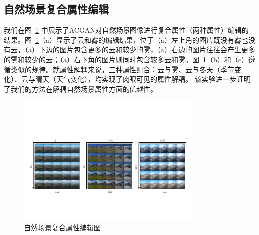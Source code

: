 \subsection{自然场景复合属性编辑}
我们在图~\ref{fig:sceneMulti} 中展示了ACGAN对自然场景图像进行复合属性（两种属性）编辑的结果。图~\ref{fig:sceneMulti}（a）显示了云和雾的编辑结果，位于（a）左上角的图片既没有雾也没有云，（a）下边的图片包含更多的云和较少的雾，（a）右边的图片往往会产生更多的雾和较少的云；（a）右下角的图片则同时包含较多云和雾。图~\ref{fig:sceneMulti}（b）和（c）遵循类似的规律。就属性解耦来说，三种属性组合：云与雾、云与冬天（季节变化）、云与晴天（天气变化），均实现了肉眼可见的属性解耦。 该实验进一步证明了我们的方法在解耦自然场景属性方面的优越性。

\begin{figure}[!ht]
	\begin{center}
		 \includegraphics[width=0.8\textwidth]{figures/ACGAN/sceneMulti.pdf}
	\end{center}
	\caption{自然场景复合属性编辑图}
	\label{fig:sceneMulti}
\end{figure}

